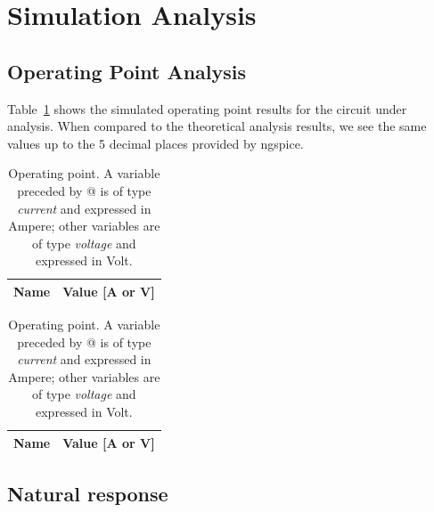 \section{Simulation Analysis}
\label{sec:simulation}

\subsection{Operating Point Analysis}

Table~\ref{tab:p1} shows the simulated operating point results for the circuit
under analysis. When compared to the theoretical analysis results, we see the same values
up to the 5 decimal places provided by ngspice.

\begin{table}[H]
  \centering
  \begin{tabular}{|l|r|}
    \hline    
    {\bf Name} & {\bf Value [A or V]} \\ \hline
    
  \end{tabular}
  \caption{Operating point. A variable preceded by @ is of type {\em current}
    and expressed in Ampere; other variables are of type {\it voltage} and expressed in
    Volt.}
  \label{tab:p1}
\end{table}

\begin{table}[H]
    \centering
    \begin{tabular}{|l|r|}
      \hline    
      {\bf Name} & {\bf Value [A or V]} \\ \hline
      
    \end{tabular}
    \caption{Operating point. A variable preceded by @ is of type {\em current}
      and expressed in Ampere; other variables are of type {\it voltage} and expressed in
      Volt.}
    \label{tab:p2}
  \end{table}

\subsection{Natural response}

